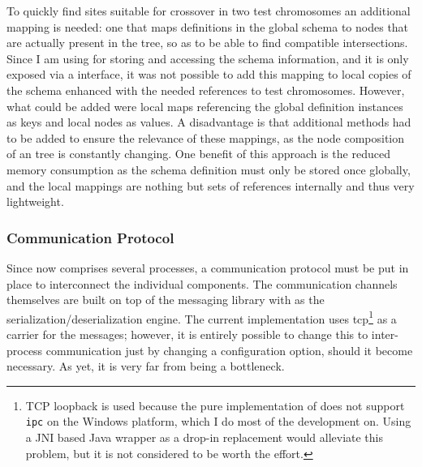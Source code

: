 To quickly find sites suitable for crossover in two test chromosomes an additional mapping is needed: 
one that maps definitions in the global schema to nodes that are actually present in the \xml tree, so 
as to be able to find compatible intersections.
Since I am using \xerces for storing and accessing the schema information, and it is only exposed via 
a \java interface, it was not possible to add this mapping to local copies of the schema  
enhanced with the needed references to test chromosomes. However, what could be added were local 
maps referencing the global definition instances as keys and local nodes as values. A disadvantage 
is that additional methods had to be added to ensure the relevance of these mappings, 
as the node composition of an \xml tree is constantly changing. 
One benefit of this approach is the reduced memory consumption as the schema
definition must only be stored once globally, and the local mappings are nothing but sets of references 
internally and thus very lightweight.
\subsubsection{Communication Protocol}
\label{sec:proto}
Since \xmlmate now comprises several processes, a communication protocol must be put in place to 
interconnect the individual components. The communication channels themselves are built on top of
the \zmq messaging library with \msgpack as the serialization/deserialization engine. The current
implementation uses tcp\footnote{TCP loopback is used because the pure \java implementation 
of \zmq does not support \texttt{ipc} on the Windows platform, which I do most of the development on.
Using a JNI based Java wrapper as a drop-in replacement would alleviate this problem, 
but it is not considered to be worth the effort.} 
as a carrier for the messages; however, it is entirely possible
to change this to inter-process communication just by changing a configuration option, should it 
become necessary. As yet, it is very far from being a bottleneck.


